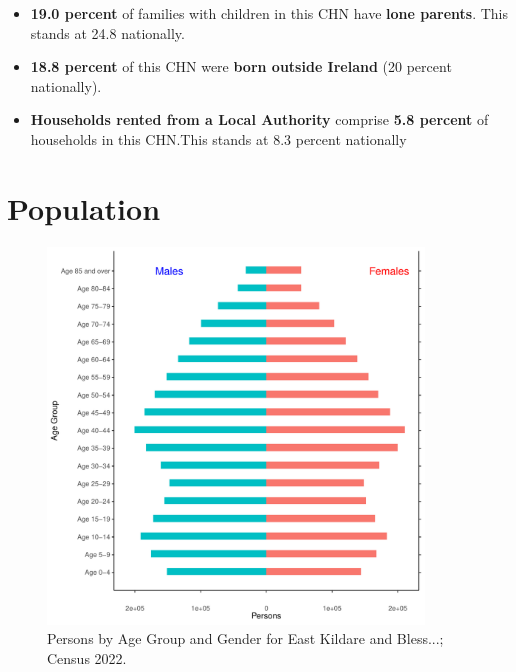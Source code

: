 \documentclass{article}
\begin{document}
\begin{itemize}
\item \textbf{19.0 percent} of families with children in this CHN have \textbf{lone parents}. This stands at 24.8 nationally.

\item \textbf{18.8 percent} of this CHN were \textbf{born outside Ireland} (20 percent nationally).

\item \textbf{Households rented from a Local Authority} comprise \textbf{5.8 percent} of households in this CHN.This stands at 8.3 percent nationally

\end{itemize}

\pagebreak

\section{Population} 
\label{sect:Pop}

\begin{figure}[h]
	\centering
	\includegraphics[width = 100mm]{../figures/PyramidPlot.pdf}
	\caption{Persons by Age Group and Gender for East Kildare and Bless...; Census 2022.}
	\label{fig:2ae19629-1a6a-13a3-e055-000000000001}
	\end{figure}
\end{document}
